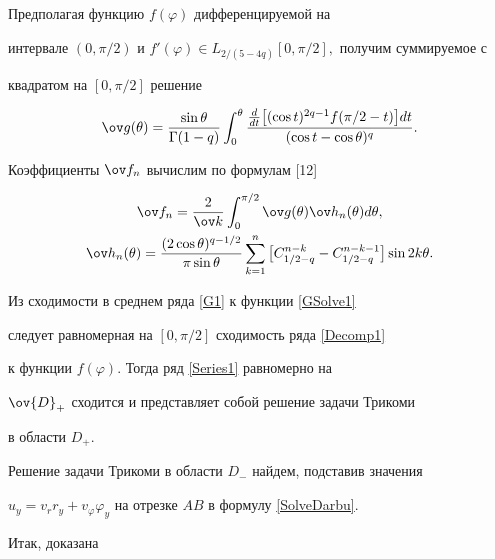 Предполагая функцию $f(\varphi)$ дифференцируемой на


интервале $(0,\pi/2)$ и $f'(\varphi)\in


L_{2/(5-4q)}[0,\pi/2],$ получим суммируемое с


квадратом на $[0,\pi/2]$ решение


\begin{equation}\label{GSolve1}


\ov g(\theta) = \frac{\sin \theta}{\Gamma(1-q)}


\int_0^\theta \frac{\frac{d}{dt}{\big[(\cos t)^{2q-1}f(\pi/2-t)\big]}dt}


{(\cos t - \cos \theta)^{q}}.


\end{equation}


Коэффициенты $\ov f_n$ вычислим по формулам [12]


\begin{gather}\label{Koef1}


\ov f_n=\frac{2}{\ov k} \int_0^{\pi/2} \ov g(\theta)\ov h_n(\theta)d\theta,\\


%


\ov h_n(\theta)= \frac{(2\cos\theta)^{q-1/2}}{\pi\sin\theta}


\sum\limits_{k=1}^n


\big[ C_{1/2-q}^{n-k}-C_{1/2-q}^{n-k-1}\big]\sin 2k\theta.\notag


\end{gather}





Из сходимости в среднем ряда \eqref{G1} к функции \eqref{GSolve1} 


следует равномерная на $[0,\pi/2]$ сходимость ряда \eqref{Decomp1}


к функции $f(\varphi)$. Тогда ряд \eqref{Series1} равномерно на


$\ov{D}_+$ сходится и представляет собой решение задачи Трикоми


в области $D_+$.





Решение задачи Трикоми в области $D_- $ найдем, подставив значения


$u_y=v_rr_y+v_\varphi\varphi_y$ на отрезке $AB$ в формулу \eqref{SolveDarbu}.





Итак, доказана





